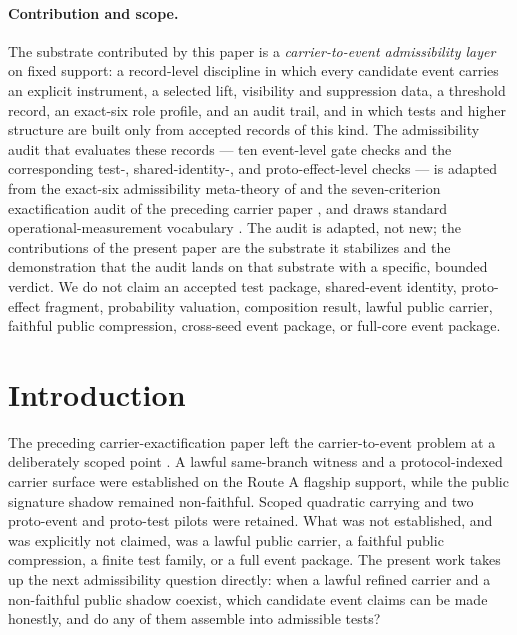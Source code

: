 \documentclass[11pt]{article}
\theoremstyle{definition}
\begin{document}
\paragraph{Contribution and scope.}
The substrate contributed by this paper is a \emph{carrier-to-event admissibility layer} on fixed support: a record-level discipline in which every candidate event carries an explicit instrument, a selected lift, visibility and suppression data, a threshold record, an exact-six role profile, and an audit trail, and in which tests and higher structure are built only from accepted records of this kind. The admissibility audit that evaluates these records — ten event-level gate checks and the corresponding test-, shared-identity-, and proto-effect-level checks — is adapted from the exact-six admissibility meta-theory of \citet{Tsiokos2026FoundationsII} and the seven-criterion exactification audit of the preceding carrier paper \citep{Tsiokos2026CarrierExactification}, and draws standard operational-measurement vocabulary \citep{DaviesLewis1970,Hardy2001Axioms}. The audit is adapted, not new; the contributions of the present paper are the substrate it stabilizes and the demonstration that the audit lands on that substrate with a specific, bounded verdict. We do not claim an accepted test package, shared-event identity, proto-effect fragment, probability valuation, composition result, lawful public carrier, faithful public compression, cross-seed event package, or full-core event package.

\section{Introduction}
\label{sec:introduction}

The preceding carrier-exactification paper left the carrier-to-event problem at a deliberately scoped point \citep{Tsiokos2026CarrierExactification}. A lawful same-branch witness and a protocol-indexed carrier surface were established on the Route A flagship support, while the public signature shadow remained non-faithful. Scoped quadratic carrying and two proto-event and proto-test pilots were retained. What was not established, and was explicitly not claimed, was a lawful public carrier, a faithful public compression, a finite test family, or a full event package. The present work takes up the next admissibility question directly: when a lawful refined carrier and a non-faithful public shadow coexist, which candidate event claims can be made honestly, and do any of them assemble into admissible tests?
\end{document}
